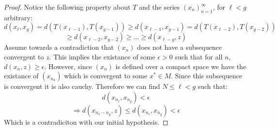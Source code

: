\documentclass[12pt,leqno]{amsart}
\begin{document}
\begin{proof}
Notice the following property about $T$ and the series $(x_n)_{n=1}^\infty$, for $\ell < g$ arbitrary:
$$ d(x_\ell, x_g) = d(T(x_{\ell-1}), T(x_{g-1})) \geq d(x_{\ell-1}, x_{g - 1}) = d(T(x_{\ell - 2}), T(x_{g-2})) $$
$$ \geq d(x_{\ell -2}, x_{g-2}) \geq \dots \geq d(x_{\ell - g}, z) $$
Assume towards a contradiction that $(x_n)$ does not have a subsequence convergent to $z$.  This implies the existance of some $\epsilon >0$ such that for all $n$, $d(x_n, z) \geq \epsilon$.  However, since $(x_n)$ is defined over a compact space we have the existance of $(x_{n_k})$ which is convergent to some $x^* \in M$.  Since this subsequence is convergent it is also cauchy.  Therefore we can find $N \leq \ell < g$ such that:
$$ d(x_{n_\ell}, x_{n_g}) < \epsilon $$
$$ \Rightarrow d(x_{n_\ell - n_g}, z) \leq d(x_{n_\ell}, x_{n_g}) < \epsilon $$
Which is a contradiciton with our initial hypothesis.
\end{proof}
\end{document}
